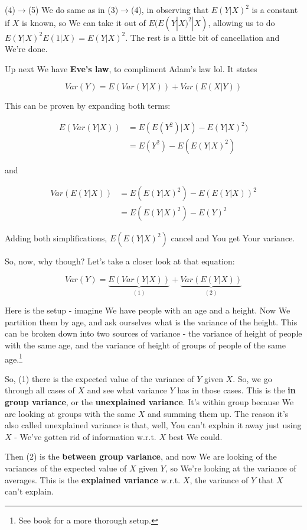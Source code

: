 \documentclass{article}
\begin{document}
		(4)$\to$(5) We do same as in (3)$\to$(4), in observing that $E(Y|X)^2$ is a constant if $X$ is known, so We can take it out of $E(E(Y|X)^2|X)$, allowing us to do $E(Y|X)^2E(1|X) = E(Y|X)^2$. The rest is a little bit of cancellation and We're done.
		
		Up next We have \textbf{Eve's law}, to compliment Adam's law lol. It states
		
		\[ Var(Y) = E(Var(Y|X)) + Var(E(X|Y))  \]
			
		This can be proven by expanding both terms:
		
		\begin{align*}
		E(Var(Y|X)) &= E(E(Y^2)|X) - E(Y|X)^2)\\
		&= E(Y^2) - E(E(Y|X)^2)
		\end{align*}
		
		and 
		
		\begin{align*}
		Var(E(Y|X)) &= E(E(Y|X)^2) - E(E(Y|X))^2\\
		&= E(E(Y|X)^2) - E(Y)^2
		\end{align*}
		
		Adding both simplifications, $E(E(Y|X)^2)$ cancel and You get Your variance.
		
		So, now, why though? Let's take a closer look at that equation:
		
		\[ Var(Y) = \underbrace{E(Var(Y|X))}_{(1)} + \underbrace{Var(E(Y|X))}_{(2)}  \]
		
		Here is the setup - imagine We have people with an age and a height. Now We partition them by age, and ask ourselves what is the variance of the height. This can be broken down into two sources of variance - the variance of height of people with the same age, and the variance of height of groups of people of the same age.\footnote{See book for a more thorough setup.}
		
		So, (1) there is the expected value of the variance of $Y$ given $X$. So, we go through all cases of $X$ and see what variance $Y$ has in those cases. This is the \textbf{in group variance}, or the \textbf{unexplained variance}. It's within group because We are looking at groups with the same $X$ and summing them up. The reason it's also called unexplained variance is that, well, You can't explain it away just using $X$ - We've gotten rid of information w.r.t. $X$ best We could.
		
		Then (2) is the \textbf{between group variance}, and now We are looking of the variances of the expected value of $X$ given $Y$, so We're looking at the variance of averages. This is the \textbf{explained variance} w.r.t. $X$, the variance of $Y$ that $X$ can't explain. 
		
\end{document}
